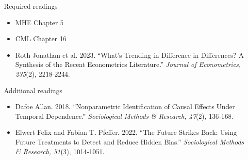 \documentclass[12pt]{article}
\begin{document}
\noindent Required readings
\begin{itemize}
    \item MHE Chapter 5
    \item CML Chapter 16
    \item Roth Jonathan et al. 2023. ``What’s Trending in Difference-in-Differences? A Synthesis of the Recent Econometrics Literature.'' \textit{Journal of Econometrics, 235}(2), 2218-2244.
\end{itemize}

\noindent Additional readings
\begin{itemize}
    \item Dafoe Allan. 2018. ``Nonparametric Identification of Causal Effects Under Temporal Dependence.'' \textit{Sociological Methods \& Research, 47}(2), 136-168.
    \item Elwert Felix and Fabian T. Pfeffer. 2022. ``The Future Strikes Back: Using Future Treatments to Detect and Reduce Hidden Bias.'' \textit{Sociological Methods \& Research, 51}(3), 1014-1051.
\end{itemize}

\begin{comment}
\vspace{1em} \noindent \textbf{\textcolor{titlecolor}{Nov 4: Synthetic Control and Event Studies}}

\noindent Required readings
\begin{itemize}
    \item Abadie Alberto, Alexis Diamond, and Jens Hainmueller. 2010. ``Synthetic Control Methods for Comparative Case Studies: Estimating the Effect of California’s Tobacco Control Program.'' \textit{Journal of the American Statistical Association, 105}(490), 493-505.
\end{itemize}

\noindent Additional readings
\begin{itemize}
    \item Abadie Alberto. 2021. ``Using Synthetic Controls: Feasibility, Data Requirements, and Methodological Aspects.'' \textit{Journal of Economic Literature, 59}(2), 391-425.
    \item Ben-Michael Eli, Avi Feller, and Jesse Rothstein. 2021. ``The Augmented Synthetic Control Method.'' \textit{Journal of the American Statistical Association, 116}(536), 1789-1803.
    \item Finkelstein Amy et al. 2025. ``Lives Versus Livelihoods: The Impact of the Great Recession on Mortality and Welfare.'' \textit{The Quarterly Journal of Economics, 140}(3), 2269-2328.
\end{itemize}
\end{comment}
\end{document}
